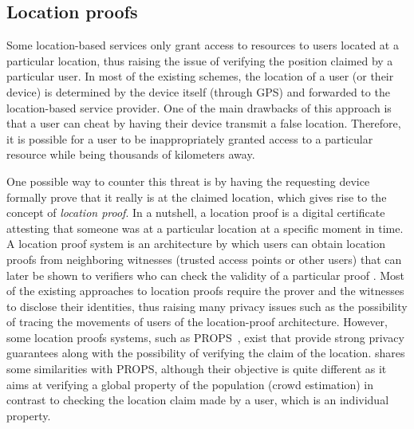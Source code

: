\subsection{Location proofs}

Some location-based services only grant access to resources to users located at a particular location, thus raising the issue of verifying the position claimed by a particular user. 
In most of the existing schemes, the location of a user (or their device) is determined by the device itself (\eg through GPS) and forwarded to the location-based service provider. 
One of the main drawbacks of this approach is that a user can cheat by having their device transmit a false location. 
Therefore, it is possible for a user to be inappropriately granted access to a particular resource while being thousands of kilometers away.

One possible way to counter this threat is by having the requesting device formally prove that it really is at the claimed location, which gives rise to the concept of \emph{location proof}. 
In a nutshell, a location proof is a digital certificate attesting that someone was at a particular location at a specific moment in time. 
A location proof system is an architecture by which users can obtain location proofs from neighboring witnesses (\eg trusted access points or other users) that can later be shown to verifiers who can check the validity of a particular proof \cite{luo2010veriplace, zhu2011applaus}.
Most of the existing approaches to location proofs require the prover and the witnesses to disclose their identities, thus raising many privacy issues such as the possibility of tracing the movements of users of the location-proof architecture.
However, some location proofs systems, such as PROPS~\cite{PROPS}, exist that provide strong privacy guarantees along with the possibility of verifying the claim of the location.
\CROCUS shares some similarities with PROPS, although their objective is quite different as it aims at verifying a global property of the population (\ie crowd estimation) in contrast to checking the location claim made by a user, which is an individual property.

